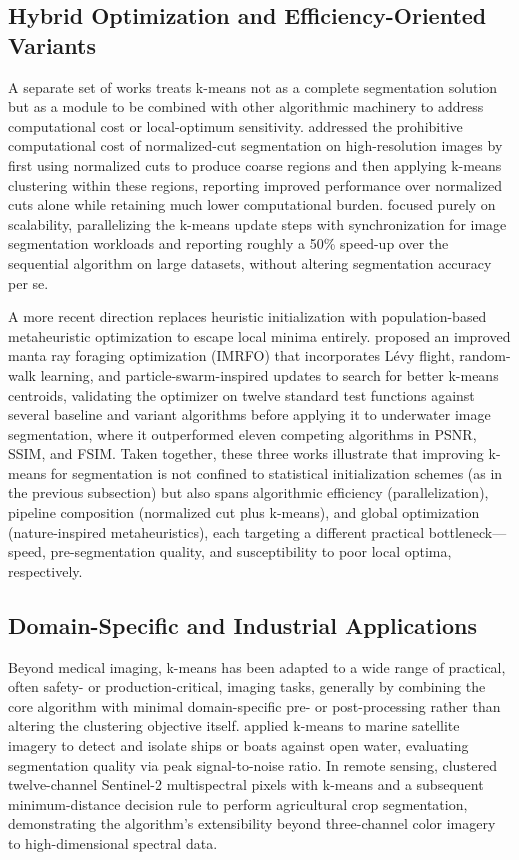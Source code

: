 \subsection{Hybrid Optimization and Efficiency-Oriented Variants}
A separate set of works treats k-means not as a complete segmentation solution but as a module to be combined with other algorithmic machinery to address computational cost or local-optimum sensitivity. \cite{yu2014improved} addressed the prohibitive computational cost of normalized-cut segmentation on high-resolution images by first using normalized cuts to produce coarse regions and then applying k-means clustering within these regions, reporting improved performance over normalized cuts alone while retaining much lower computational burden. \cite{lopez2014parallelization} focused purely on scalability, parallelizing the k-means update steps with synchronization for image segmentation workloads and reporting roughly a 50\% speed-up over the sequential algorithm on large datasets, without altering segmentation accuracy per se.

A more recent direction replaces heuristic initialization with population-based metaheuristic optimization to escape local minima entirely. \cite{zhu2022means} proposed an improved manta ray foraging optimization (IMRFO) that incorporates L{\'e}vy flight, random-walk learning, and particle-swarm-inspired updates to search for better k-means centroids, validating the optimizer on twelve standard test functions against several baseline and variant algorithms before applying it to underwater image segmentation, where it outperformed eleven competing algorithms in PSNR, SSIM, and FSIM. Taken together, these three works illustrate that improving k-means for segmentation is not confined to statistical initialization schemes (as in the previous subsection) but also spans algorithmic efficiency (parallelization), pipeline composition (normalized cut plus k-means), and global optimization (nature-inspired metaheuristics), each targeting a different practical bottleneck---speed, pre-segmentation quality, and susceptibility to poor local optima, respectively.

\subsection{Domain-Specific and Industrial Applications}
Beyond medical imaging, k-means has been adapted to a wide range of practical, often safety- or production-critical, imaging tasks, generally by combining the core algorithm with minimal domain-specific pre- or post-processing rather than altering the clustering objective itself. \cite{manahoran2017means} applied k-means to marine satellite imagery to detect and isolate ships or boats against open water, evaluating segmentation quality via peak signal-to-noise ratio. In remote sensing, \cite{kazakhstan2019multi} clustered twelve-channel Sentinel-2 multispectral pixels with k-means and a subsequent minimum-distance decision rule to perform agricultural crop segmentation, demonstrating the algorithm's extensibility beyond three-channel color imagery to high-dimensional spectral data.

